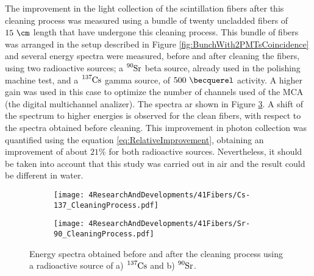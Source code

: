 The improvement in the light collection of the scintillation fibers after this cleaning process was measured using a bundle of twenty uncladded fibers of $15~\cm$ length that have undergone this cleaning process. This bundle of fibers was arranged in the setup described in Figure \ref{fig:BunchWith2PMTsCoincidence} and several energy spectra were measured, before and after cleaning the fibers, using two radioactive sources; a $\ce{^{90}Sr}$ beta source, already used in the polishing machine test, and a $\ce{^{137}Cs}$ gamma source, of $500~\becquerel$ activity. A higher gain was used in this case to optimize the number of channels used of the MCA (the digital multichannel analizer). The spectra ar shown in Figure \ref{fig:ResultsOfCleaningProcess}. A shift of the spectrum to higher energies is observed for the clean fibers, with respect to the spectra obtained before cleaning. This improvement in photon collection was quantified using the equation \ref{eq:RelativeImprovement}, obtaining an improvement of about $21\%$ for both radioactive sources. Nevertheless, it should be taken into account that this study was carried out in air and the result could be different in water.

\begin{figure}
\centering
    \begin{subfigure}[b]{1\textwidth}
    \centering
    \texttt{[image: 4ResearchAndDevelopments/41Fibers/Cs-137\_CleaningProcess.pdf]}  
    \caption{\label{subfig:EnergySpectrumCo60CleaningTest}}
    \end{subfigure}
    \hfill
    \begin{subfigure}[b]{1\textwidth}
    \centering
    \texttt{[image: 4ResearchAndDevelopments/41Fibers/Sr-90\_CleaningProcess.pdf]}  
    \caption{\label{subfig:EnergySpectrumSr90CleaningTest}}
    \end{subfigure}
 \caption{Energy spectra obtained before and after the cleaning process using a radioactive source of a) $\ce{^{137}Cs}$ and b) $\ce{^{90}Sr}$.}
 \label{fig:ResultsOfCleaningProcess}
\end{figure}



